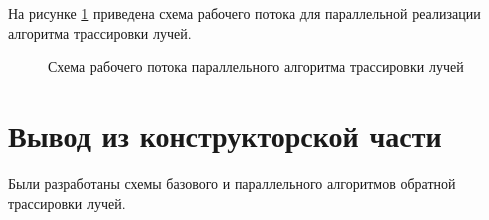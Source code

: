 На рисунке \ref{fig:trass_count} приведена схема рабочего потока для параллельной реализации алгоритма трассировки лучей.

\newpage
\begin{figure}[h!]
	
	
	\caption{Схема рабочего потока параллельного алгоритма трассировки лучей}
	
	\label{fig:trass_count}
	
\end{figure}



\section{Вывод из конструкторской части}

Были разработаны схемы базового и параллельного алгоритмов обратной трассировки лучей.


